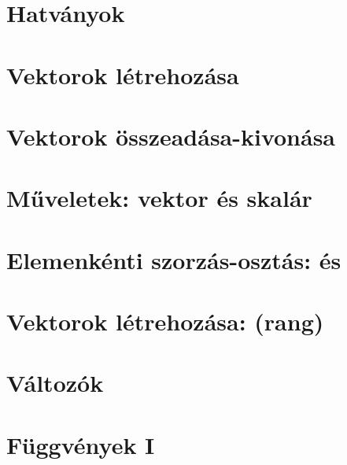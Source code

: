 \begin{spacing}{1.4}
\section*{Hatványok} \label{DBmatlabia5Mo}
\Mo{

}
\vspace{0.5cm}
\newpage
\section*{Vektorok létrehozása} \label{DBmatlabia6}
\Desc{

}
\vspace{0.5cm}
\newpage
\section*{Vektorok összeadása-kivonása} \label{DBmatlabia6s}
\Desc{

}
\vspace{0.5cm}
\newpage
\section*{Műveletek: vektor és skalár} \label{DBmatlabia7}
\Desc{

}
\vspace{0.5cm}
\newpage
\section*{Elemenkénti szorzás-osztás:  és } \label{DBmatlabia8}
\Desc{

}
\vspace{0.5cm}
\newpage
\section*{Vektorok létrehozása: \mcode{:} (rang)} \label{DBmatlabia9}
\Desc{

}
\vspace{0.5cm}
\newpage
\section*{Változók} \label{DBmatlabia10}
\Desc{

}
\vspace{0.5cm}
\newpage
\section*{Függvények I} \label{DBmatlabia11}
\Desc{

}
\vspace{0.5cm}
\newpage

\end{spacing}
